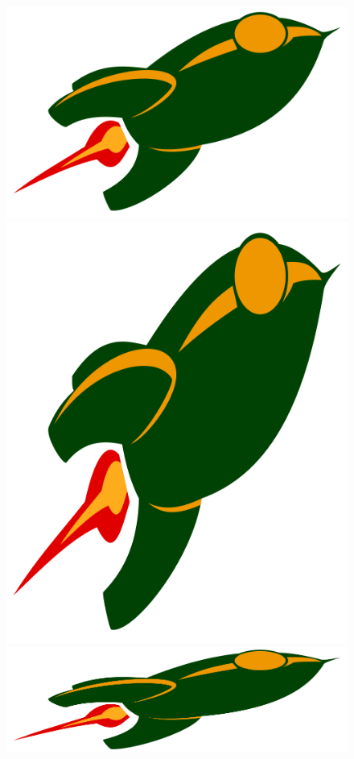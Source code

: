 \begin{figure}
  \includegraphics[width=\columnwidth/100*66]{images/scale-image-orig.png}
  \includegraphics[width=\columnwidth/100*33]{images/scale-image-bad1.png}
  \includegraphics[width=\columnwidth/100*66]{images/scale-image-bad2.png}

\end{figure}
